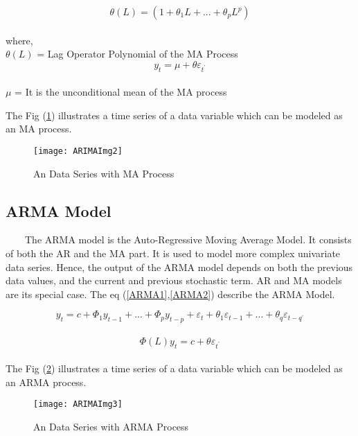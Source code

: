 \begin{equation}
\label{MA2}
\theta(L) = ( 1 + \theta_{1}L + ... + \theta_{p}L^{p} )
\end{equation}\\
where,\\
$ \theta(L) $ = Lag Operator Polynomial of the MA Process\\

\begin{equation}
\label{MA3}
y_{t} = \mu + \theta\varepsilon_{t^{'}}
\end{equation}\\
$ \mu $ = It is the unconditional mean of the MA process

The Fig (\ref{figc7h2}) illustrates a time series of a data variable which can be modeled as an MA process.

\begin{figure}[H]
\centering
\texttt{[image: ARIMAImg2]}
\caption{An Data Series with MA Process}
\label{figc7h2} %
\end{figure}

\subsection{ARMA Model}
\
\
\
\
The ARMA model is the Auto-Regressive Moving Average Model. It consists of both the AR and the MA part. It is used to model more complex univariate data series. Hence, the output of the ARMA model depends on both the previous data values, and the current and previous stochastic term. AR and MA models are its special case.
The eq (\ref{ARMA1},\ref{ARMA2}) describe the ARMA Model.

\begin{equation}
\label{ARMA1}
y_{t}= c + \Phi_{1}y_{t-1} + ... + \Phi_{p}y_{t-p} + \varepsilon_{t} +  \theta_{1}\varepsilon_{t-1} + ... + \theta_{q}\varepsilon_{t-q^{'}}
\end{equation}\\


\begin{equation}
\label{ARMA2}
\Phi(L)y_{t} = c + \theta\varepsilon_{t^{'}}
\end{equation}\\

The Fig (\ref{figc7h3}) illustrates a time series of a data variable which can be modeled as an ARMA process.

\begin{figure}[H]
\centering
\texttt{[image: ARIMAImg3]}
\caption{An Data Series with ARMA Process}
\label{figc7h3} %
\end{figure}

